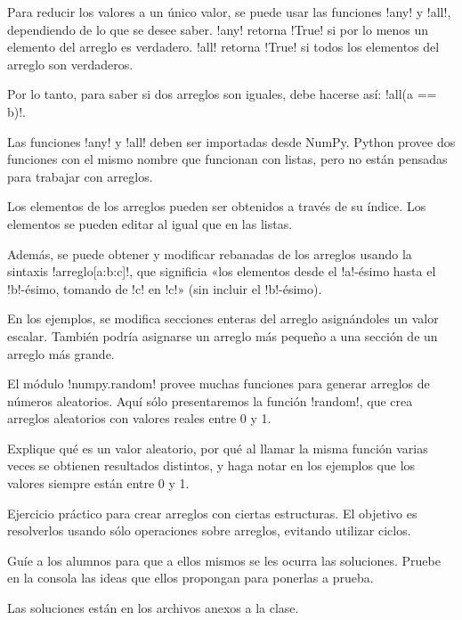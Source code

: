 \documentclass[10pt]{article}
\begin{document}
  Para reducir los valores a un único valor,
  se puede usar las funciones \li!any! y \li!all!,
  dependiendo de lo que se desee saber.
  \li!any! retorna \li!True!
  si por lo menos un elemento del arreglo
  es verdadero.
  \li!all! retorna \li!True!
  si todos los elementos del arreglo
  son verdaderos.

  Por lo tanto,
  para saber si dos arreglos son iguales,
  debe hacerse así: \li!all(a == b)!.

  Las funciones \li!any! y \li!all!
  deben ser importadas desde NumPy.
  Python provee dos funciones con el mismo nombre
  que funcionan con listas,
  pero no están pensadas
  para trabajar con arreglos.


  Los elementos de los arreglos
  pueden ser obtenidos
  a través de su índice.
  Los elementos se pueden editar
  al igual que en las listas.

  Además, se puede obtener y modificar
  rebanadas de los arreglos
  usando la sintaxis \li!arreglo[a:b:c]!,
  que significia
  «los elementos desde el \li!a!-ésimo hasta el \li!b!-ésimo,
  tomando de \li!c! en \li!c!» (sin incluir el \li!b!-ésimo).

  En los ejemplos,
  se modifica secciones enteras del arreglo
  asignándoles un valor escalar.
  También podría asignarse
  un arreglo más pequeño
  a una sección de un arreglo más grande.


  El módulo \li!numpy.random!
  provee muchas funciones
  para generar arreglos de números aleatorios.
  Aquí sólo presentaremos la función \li!random!,
  que crea arreglos aleatorios
  con valores reales entre 0 y 1.

  Explique qué es un valor aleatorio,
  por qué al llamar la misma función varias veces
  se obtienen resultados distintos,
  y haga notar en los ejemplos
  que los valores siempre están entre 0 y 1.


  Ejercicio práctico
  para crear arreglos con ciertas estructuras.
  El objetivo es resolverlos usando
  sólo operaciones sobre arreglos,
  evitando utilizar ciclos.

  Guíe a los alumnos
  para que a ellos mismos se les ocurra las soluciones.
  Pruebe en la consola
  las ideas que ellos propongan
  para ponerlas a prueba.

  Las soluciones están en los archivos anexos
  a la clase.
\end{document}
